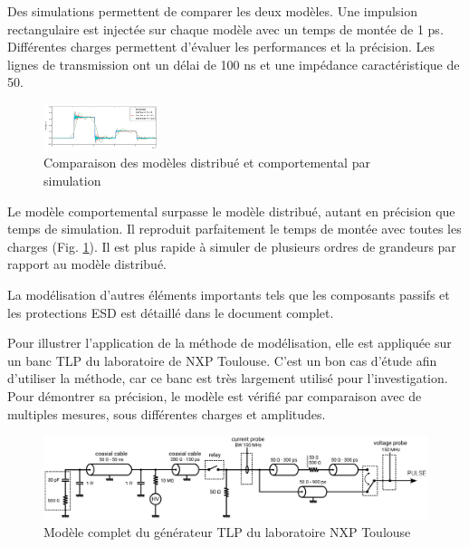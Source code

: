 Des simulations permettent de comparer les deux modèles.
Une impulsion rectangulaire est injectée sur chaque modèle avec un temps de montée de 1 ps.
Différentes charges permettent d'évaluer les performances et la précision.
Les lignes de transmission ont un délai de 100 ns et une impédance caractéristique de 50\textOmega{}.

\begin{figure}[!h]
  \centering
  \includegraphics[width=0.3\textwidth]{src/1/figures/tline_comparison.png}
  \caption{Comparaison des modèles distribué et comportemental par simulation}
  \label{fig:lines-simulations}
\end{figure}

Le modèle comportemental surpasse le modèle distribué, autant en précision que temps de simulation.
Il reproduit parfaitement le temps de montée avec toutes les charges (Fig. \ref{fig:lines-simulations}).
Il est plus rapide à simuler de plusieurs ordres de grandeurs par rapport au modèle distribué.

La modélisation d'autres éléments importants tels que les composants passifs et les protections ESD est détaillé dans le document complet.

Pour illustrer l'application de la méthode de modélisation, elle est appliquée sur un banc TLP du laboratoire de NXP Toulouse.
C'est un bon cas d'étude afin d'utiliser la méthode, car ce banc est très largement utilisé pour l'investigation.
Pour démontrer sa précision, le modèle est vérifié par comparaison avec de multiples mesures, sous différentes charges et amplitudes.

\begin{figure}[!h]
  \centering
  \includegraphics[width=\textwidth]{src/1/figures/complete_nxp_tlp_model.pdf}
  \caption{Modèle complet du générateur TLP du laboratoire NXP Toulouse}
  \label{fig:complete-tlp-model}
\end{figure}

